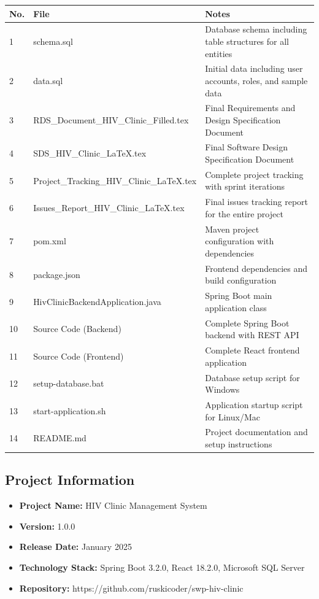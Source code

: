 \documentclass[12pt,a4paper]{article}
\begin{document}
\begin{longtable}{@{}|p{1cm}|p{6cm}|p{7cm}|@{}}
\hline
\textbf{No.} & \textbf{File} & \textbf{Notes} \\
\hline
1 & schema.sql & Database schema including table structures for all entities \\
\hline
2 & data.sql & Initial data including user accounts, roles, and sample data \\
\hline
3 & RDS\_Document\_HIV\_Clinic\_Filled.tex & Final Requirements and Design Specification Document \\
\hline
4 & SDS\_HIV\_Clinic\_LaTeX.tex & Final Software Design Specification Document \\
\hline
5 & Project\_Tracking\_HIV\_Clinic\_LaTeX.tex & Complete project tracking with sprint iterations \\
\hline
6 & Issues\_Report\_HIV\_Clinic\_LaTeX.tex & Final issues tracking report for the entire project \\
\hline
7 & pom.xml & Maven project configuration with dependencies \\
\hline
8 & package.json & Frontend dependencies and build configuration \\
\hline
9 & HivClinicBackendApplication.java & Spring Boot main application class \\
\hline
10 & Source Code (Backend) & Complete Spring Boot backend with REST API \\
\hline
11 & Source Code (Frontend) & Complete React frontend application \\
\hline
12 & setup-database.bat & Database setup script for Windows \\
\hline
13 & start-application.sh & Application startup script for Linux/Mac \\
\hline
14 & README.md & Project documentation and setup instructions \\
\hline
\end{longtable}

\subsection{Project Information}

\begin{itemize}
    \item \textbf{Project Name:} HIV Clinic Management System
    \item \textbf{Version:} 1.0.0
    \item \textbf{Release Date:} January 2025
    \item \textbf{Technology Stack:} Spring Boot 3.2.0, React 18.2.0, Microsoft SQL Server
    \item \textbf{Repository:} https://github.com/ruskicoder/swp-hiv-clinic
\end{itemize}
\end{document}
